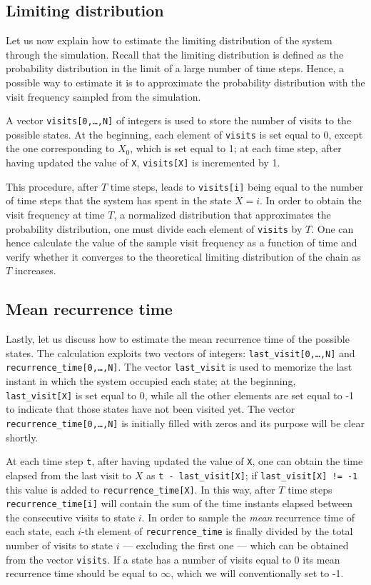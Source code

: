 \subsection{Limiting distribution}
Let us now explain how to estimate the limiting distribution of the system through the simulation. Recall that the limiting distribution is defined as the probability distribution in the limit of a large number of time steps. Hence, a possible way to estimate it is to approximate the probability distribution  with the visit frequency sampled from the simulation. 

A vector \texttt{visits[0,\dots,N]} of integers is used to store the number of visits to the possible states. At the beginning, each element of \texttt{visits} is set equal to 0, except the one corresponding to $X_0$, which is set equal to 1; at each time step, after having updated the value of \texttt{X}, \texttt{visits[X]} is incremented by 1. 

This procedure, after $T$ time steps, leads to \texttt{visits[i]} being equal to the number of time steps that the system has spent in the state $X = i$. In order to obtain the visit frequency at time $T$, \ie a normalized distribution that approximates the probability distribution, one must divide each element of \texttt{visits} by $T$. One can hence calculate the value of the sample visit frequency as a function of time and verify whether it converges to the theoretical limiting distribution of the chain as $T$ increases.

\subsection{Mean recurrence time}
Lastly, let us discuss how to estimate the mean recurrence time of the possible states. The calculation exploits two vectors of integers: \texttt{last\_visit[0,\dots,N]} and \texttt{recurrence\_time[0,\dots,N]}. The vector \texttt{last\_visit} is used to memorize the last instant in which the system occupied each state; at the beginning, \texttt{last\_visit[X]} is set equal to 0, while all the other elements are set equal to -1 to indicate that those states have not been visited yet. The vector \texttt{recurrence\_time[0,\dots,N]} is initially filled with zeros and its purpose will be clear shortly.

At each time step \texttt{t}, after having updated the value of \texttt{X}, one can obtain the time elapsed from the last visit to $X$ as \texttt{t - last\_visit[X]}; if \texttt{last\_visit[X] != -1} this value is added to \texttt{recurrence\_time[X]}. In this way, after $T$ time steps \texttt{recurrence\_time[i]} will contain the sum of the time instants elapsed between the consecutive visits to state $i$. In order to sample the \emph{mean} recurrence time of each state, each $i$-th element of \texttt{recurrence\_time} is finally divided by the total number of visits to state $i$ --- excluding the first one --- which can be obtained from the vector \texttt{visits}. If a state has a number of visits equal to 0 its mean recurrence time should be equal to $\infty$, which we will conventionally set to -1. 

